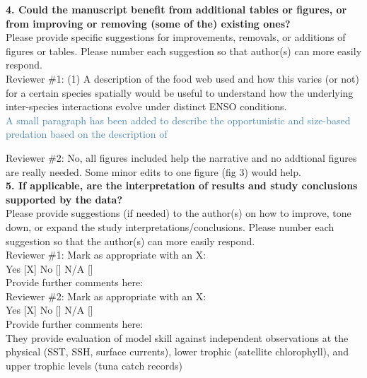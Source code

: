 \documentclass[12pt]{article}
\newcommand{\resp}[1]{\textcolor{SteelBlue}{#1}}
\begin{document}
\textbf{4. Could the manuscript benefit from additional tables or figures, or from improving or removing (some of the) existing ones?} \\

Please provide specific suggestions for improvements, removals, or additions of figures or tables. Please number each suggestion so that author(s) can more easily respond.\\

Reviewer \#1: (1) A description of the food web used and how this varies (or not) for a certain species spatially would be useful to understand how the underlying inter-species interactions evolve under distinct ENSO conditions.\\

\resp{A small paragraph has been added to describe the opportunistic and size-based predation based on the
description of \cite{mauryIndividualsPopulationsCommunities2013}}


Reviewer \#2: No, all figures included help the narrative and no addtional figures are really needed. Some minor edits to one figure (fig 3) would help.\\

\textbf{5. If applicable, are the interpretation of results and study conclusions supported by the data?}\\

Please provide suggestions (if needed) to the author(s) on how to improve, tone down, or expand the study interpretations/conclusions. Please number each suggestion so that the author(s) can more easily respond.\\

Reviewer \#1: Mark as appropriate with an X:\\
Yes [X] No [] N/A []\\
Provide further comments here:\\

Reviewer \#2: Mark as appropriate with an X:\\
Yes [X] No [] N/A []\\

Provide further comments here:\\ 

They provide evaluation of model skill against independent observations at the physical (SST, SSH, surface currents), lower trophic (satellite chlorophyll), and upper trophic levels (tuna catch records) \\
\end{document}
